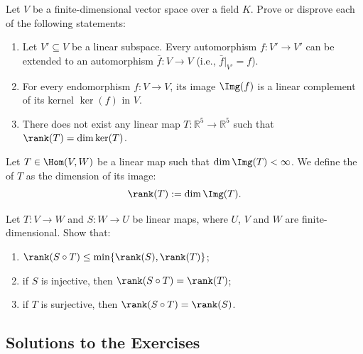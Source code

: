 \begin{exercise}
\label{exc:endomorphism_properties_true_false}
Let $V$ be a finite-di\-men\-sional vector space over a field $K$. Prove or disprove each of the following statements:
\begin{enumerate}
    \item Let $V' \subseteq V$ be a linear subspace. Every automorphism $f \colon V' \to V'$ can be extended to an automorphism $\bar{f} \colon V \to V$ (i.e., $\bar{f}|_{V'} = f$).
    \item For every endomorphism $f \colon V \to V$, its image $\Img(f)$ is a linear complement of its kernel $\ker(f)$ in $V$.
    \item There does not exist any linear map $T \colon \mathbb{R}^5 \to \mathbb{R}^5$ such that $\rank(T) = \dim \ker(T)$.
\end{enumerate}
\end{exercise}

\begin{definition}
\label{def:rank_linear_map}
Let $T \in \Hom(V, W)$ be a linear map such that $\dim \Img(T) < \infty$. We define the  of $T$ as the dimension of its image:
\[
\rank(T) := \dim \Img(T).
\]
\end{definition}

\begin{exercise}
\label{exc:rank_of_composition}
Let $T: V \to W$ and $S: W \to U$ be linear maps, where $U$, $V$ and $W$ are finite-di\-men\-sional. Show that:
\begin{enumerate}[label=\textbf{(\alph*)}]
    \item $\rank(S \circ T) \le \min\{\rank(S), \rank(T)\}$;
    \item if $S$ is injective, then $\rank(S \circ T) = \rank(T)$;
    \item if $T$ is surjective, then $\rank(S \circ T) = \rank(S)$.
\end{enumerate}
\end{exercise}

\subsection{Solutions to the Exercises}

